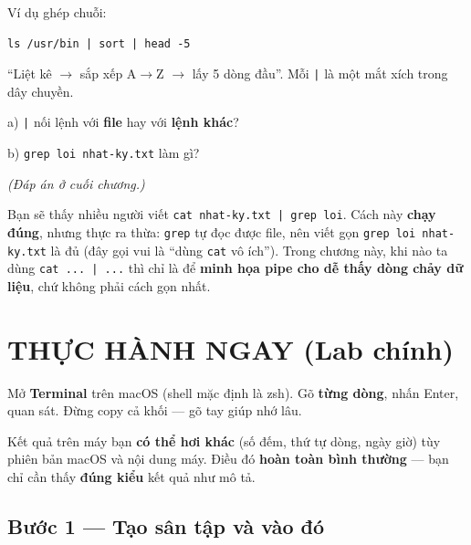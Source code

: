 \documentclass[12pt,a4paper]{article}
\newcommand{\cmd}[1]{\texttt{#1}}
\begin{document}
Ví dụ ghép chuỗi:

\begin{Verbatim}
ls /usr/bin | sort | head -5
\end{Verbatim}

``Liệt kê $\rightarrow$ sắp xếp A$\rightarrow$Z $\rightarrow$ lấy 5 dòng đầu''. Mỗi \cmd{|} là một mắt xích trong dây chuyền.

\begin{checkbox}[title={Tự kiểm tra 7}]
a) \cmd{|} nối lệnh với \textbf{file} hay với \textbf{lệnh khác}?

b) \cmd{grep loi nhat-ky.txt} làm gì?

\textit{(Đáp án ở cuối chương.)}
\end{checkbox}

\begin{notebox}[title={Lưu ý nhỏ về thói quen tốt}]
Bạn sẽ thấy nhiều người viết \cmd{cat nhat-ky.txt | grep loi}. Cách này \textbf{chạy đúng}, nhưng thực ra thừa: \cmd{grep} tự đọc được file, nên viết gọn \cmd{grep loi nhat-ky.txt} là đủ (đây gọi vui là ``dùng \cmd{cat} vô ích''). Trong chương này, khi nào ta dùng \cmd{cat ... | ...} thì chỉ là để \textbf{minh họa pipe cho dễ thấy dòng chảy dữ liệu}, chứ không phải cách gọn nhất.
\end{notebox}

\section{THỰC HÀNH NGAY (Lab chính)}

\begin{labbox}[title={Thực hành ngay --- Lab chính}]
Mở \textbf{Terminal} trên macOS (shell mặc định là zsh). Gõ \textbf{từng dòng}, nhấn Enter, quan sát. Đừng copy cả khối --- gõ tay giúp nhớ lâu.
\end{labbox}

\begin{notebox}[title={Trấn an}]
Kết quả trên máy bạn \textbf{có thể hơi khác} (số đếm, thứ tự dòng, ngày giờ) tùy phiên bản macOS và nội dung máy. Điều đó \textbf{hoàn toàn bình thường} --- bạn chỉ cần thấy \textbf{đúng kiểu} kết quả như mô tả.
\end{notebox}

\subsection{Bước 1 --- Tạo sân tập và vào đó}
\end{document}
